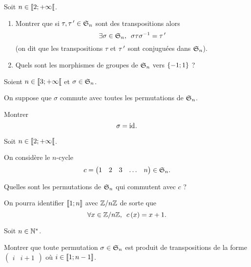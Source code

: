 \begin{corr}
\end{corr}

\begin{exo}
Soit \(n\in\interventierie{2}{\pinf}\).

\begin{enumerate}
\item Montrer que si \(\tau,\tau\prim\in\S{n}\) sont des transpositions alors \[\quantifs{\exists\sigma\in\S{n}}\sigma\tau\sigma\inv=\tau\prim\] (on dit que les transpositions \(\tau\) et \(\tau\prim\) sont conjuguées dans \(\S{n}\)). \\

\item Quels sont les morphismes de groupes de \(\S{n}\) vers \(\accol{-1;1}\) ?
\end{enumerate}
\end{exo}

\begin{corr}
\end{corr}

\begin{exo}
Soient \(n\in\interventierie{3}{\pinf}\) et \(\sigma\in\S{n}\).

On suppose que \(\sigma\) commute avec toutes les permutations de \(\S{n}\).

Montrer \[\sigma=\id{}.\]
\end{exo}

\begin{corr}
\end{corr}

\begin{exo}
Soit \(n\in\interventierie{2}{\pinf}\).

On considère le \(n\)-cycle \[c=\begin{pmatrix}1 & 2 & 3 & \dots & n\end{pmatrix}\in\S{n}.\]

Quelles sont les permutations de \(\S{n}\) qui commutent avec \(c\) ?

On pourra identifier \(\interventierii{1}{n}\) avec \(\Z/n\Z\) de sorte que \[\quantifs{\forall x\in\Z/n\Z}c\paren{x}=x+1.\]
\end{exo}

\begin{corr}
\end{corr}

\begin{exo}
Soit \(n\in\Ns\).

Montrer que toute permutation \(\sigma\in\S{n}\) est produit de transpositions de la forme \(\begin{pmatrix}i & i+1\end{pmatrix}\) où \(i\in\interventierii{1}{n-1}\).
\end{exo}

